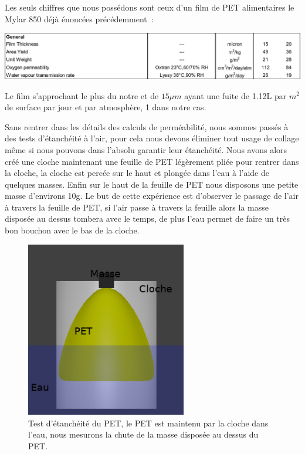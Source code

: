 \documentclass[a4paper,11pt]{article}
\begin{document}
Les seuls chiffres que nous possédons sont ceux d'un film de PET alimentaires le Mylar 850 déjà énoncées précédemment~:

\begin{center}
 \includegraphics[width=15cm]{../Images/permeabilite.png}
\end{center}

Le film s'approchant le plus du notre et de $15\mu m$ ayant une fuite de 1.12L par $m^2$ de surface par jour et par atmosphère, 1 dans notre cas.

Sans rentrer dans les détails des calculs de perméabilité, nous sommes passés à des tests d'étanchéité à l'air, pour cela nous devons éliminer tout usage de collage même si nous pouvons dans l'absolu garantir leur étanchéité.
Nous avons alors créé une cloche maintenant une feuille de PET légèrement pliée pour rentrer dans la cloche, la cloche est percée sur le haut et plongée dans l'eau à l'aide de quelques masses. Enfin sur le haut de la feuille de PET nous disposons une petite masse d'environs 10g.
Le but de cette expérience est d'observer le passage de l'air à travers la feuille de PET, si l'air passe à travers la feuille alors la masse disposée au dessus tombera avec le temps, de plus l'eau permet de faire un très bon bouchon avec le bas de la cloche.

\begin{figure}[H]
	\centering
	\includegraphics[width=7cm]{../Images/etancheite.png}
	\caption{Test d'étanchéité du PET, le PET est maintenu par la cloche dans l'eau, nous mesurons la chute de la masse disposée au dessus du PET.}
\end{figure}
\end{document}
